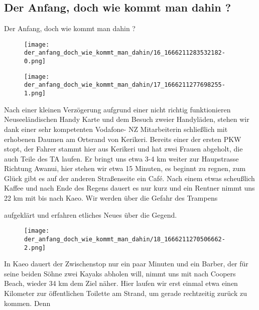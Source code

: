 \subsection{Der Anfang, doch wie kommt man dahin ?}

Der Anfang, doch wie kommt man dahin ?


\begin{figure}[H]
	\centering
	\texttt{[image: der\_anfang\_doch\_wie\_kommt\_man\_dahin/16\_1666211283532182-0.png]}
	\caption{}
	\label{fig:16_1666211283532182-0}
\end{figure}

\begin{figure}[H]
	\centering
	\texttt{[image: der\_anfang\_doch\_wie\_kommt\_man\_dahin/17\_1666211277698255-1.png]}
	\caption{}
	\label{fig:17_1666211277698255-1}
\end{figure}

  Nach einer kleinen Verzögerung aufgrund einer nicht richtig funktionieren Neuseeländischen Handy Karte und dem Besuch zweier Handyläden, stehen wir dank einer sehr kompetenten Vodafone- NZ Mitarbeiterin schließlich mit erhobenen Daumen am Ortsrand von Kerikeri. Bereits einer der ersten PKW stopt, der Fahrer stammt hier aus Kerikeri und hat zwei Frauen abgeholt, die auch Teile des TA laufen. Er bringt uns etwa 3-4 km weiter zur Haupstrasse Richtung Awanui, hier stehen wir etwa 15 Minuten, es beginnt zu regnen, zum Glück gibt es auf der anderen Straßenseite ein Café. Nach einem etwas scheußlich Kaffee und nach Ende des Regens dauert es nur kurz und ein Rentner nimmt uns 22 km mit bis nach Kaeo. Wir werden über die Gefahr des Trampens
 


  aufgeklärt und erfahren etliches Neues über die Gegend.
 


\begin{figure}[H]
	\centering
	\texttt{[image: der\_anfang\_doch\_wie\_kommt\_man\_dahin/18\_1666211270506662-2.png]}
	\caption{}
	\label{fig:18_1666211270506662-2}
\end{figure}

  In Kaeo dauert der Zwischenstop nur ein paar Minuten und ein Barber, der für seine beiden Söhne zwei Kayaks abholen will, nimmt uns mit nach Coopers Beach, wieder 34 km dem Ziel näher. Hier laufen wir erst einmal etwa einen Kilometer zur öffentlichen Toilette am Strand, um gerade rechtzeitig zurück zu kommen. Denn
 


